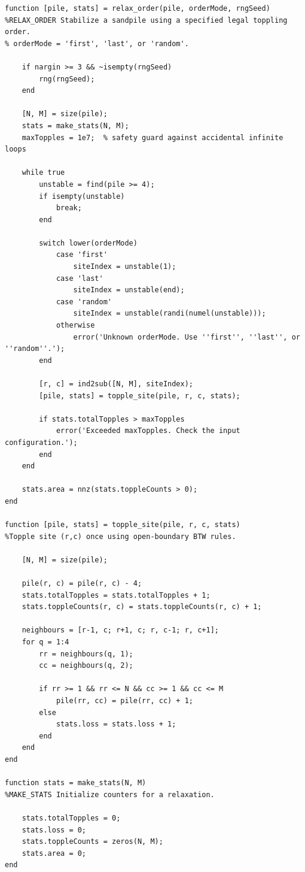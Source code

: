 \documentclass{article}
\begin{document}
\begin{lstlisting}
function [pile, stats] = relax_order(pile, orderMode, rngSeed)
%RELAX_ORDER Stabilize a sandpile using a specified legal toppling order.
% orderMode = 'first', 'last', or 'random'.

    if nargin >= 3 && ~isempty(rngSeed)
        rng(rngSeed);
    end

    [N, M] = size(pile);
    stats = make_stats(N, M);
    maxTopples = 1e7;  % safety guard against accidental infinite loops

    while true
        unstable = find(pile >= 4);
        if isempty(unstable)
            break;
        end

        switch lower(orderMode)
            case 'first'
                siteIndex = unstable(1);
            case 'last'
                siteIndex = unstable(end);
            case 'random'
                siteIndex = unstable(randi(numel(unstable)));
            otherwise
                error('Unknown orderMode. Use ''first'', ''last'', or ''random''.');
        end

        [r, c] = ind2sub([N, M], siteIndex);
        [pile, stats] = topple_site(pile, r, c, stats);

        if stats.totalTopples > maxTopples
            error('Exceeded maxTopples. Check the input configuration.');
        end
    end

    stats.area = nnz(stats.toppleCounts > 0);
end

function [pile, stats] = topple_site(pile, r, c, stats)
%Topple site (r,c) once using open-boundary BTW rules.

    [N, M] = size(pile);

    pile(r, c) = pile(r, c) - 4;
    stats.totalTopples = stats.totalTopples + 1;
    stats.toppleCounts(r, c) = stats.toppleCounts(r, c) + 1;

    neighbours = [r-1, c; r+1, c; r, c-1; r, c+1];
    for q = 1:4
        rr = neighbours(q, 1);
        cc = neighbours(q, 2);

        if rr >= 1 && rr <= N && cc >= 1 && cc <= M
            pile(rr, cc) = pile(rr, cc) + 1;
        else
            stats.loss = stats.loss + 1;
        end
    end
end

function stats = make_stats(N, M)
%MAKE_STATS Initialize counters for a relaxation.

    stats.totalTopples = 0;
    stats.loss = 0;
    stats.toppleCounts = zeros(N, M);
    stats.area = 0;
end
\end{lstlisting}

\clearpage
\end{document}
